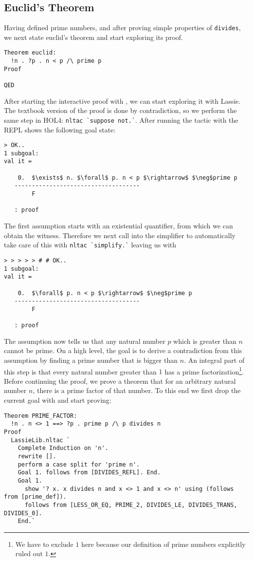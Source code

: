 \subsection{Euclid's Theorem}
Having defined prime numbers, and after proving simple properties of
\lstinline{divides}, we next state euclid's theorem and start
exploring its proof.

\begin{lstlisting}
Theorem euclid:
  !n . ?p . n < p /\ prime p
Proof

QED
\end{lstlisting}

After starting the interactive proof with , we can start exploring
it with Lassie.
The textbook version of the proof is done by contradiction, so we perform the
same step in HOL4: \lstinline{nltac `suppose not.`}.
After running the tactic with  the REPL shows the following goal state:
%
\begin{lstlisting}[frame=single, mathescape=true]
> OK..
1 subgoal:
val it =

    0.  $\exists$ n. $\forall$ p. n < p $\rightarrow$ $\neg$prime p
   ------------------------------------
        F

   : proof
\end{lstlisting}

The first assumption starts with an existential quantifier, from which we can
obtain the witness. Therefore we next call into the simplifier to automatically
take care of this with \lstinline{nltac `simplify.`} leaving us with
%
\begin{lstlisting}[frame=single, mathescape=true]
> > > > > # # OK..
1 subgoal:
val it =

    0.  $\forall$ p. n < p $\rightarrow$ $\neg$prime p
   ------------------------------------
        F

   : proof
\end{lstlisting}

The assumption now tells us that any natural number $p$ which is greater than
$n$ cannot be prime.
On a high level, the goal is to derive a contradiction from this assumption by
finding a prime number that is bigger than $n$.
An integral part of this step is that every natural number greater than $1$ has
a prime factorization\footnote{We have to exclude $1$ here because our definition of prime numbers explicitly ruled out $1$.}.
Before continuing the proof, we prove a theorem that for an arbitrary natural
number $n$, there is a prime factor of that number.
To this end we first drop the current goal with  and start proving:
%
\begin{lstlisting}
Theorem PRIME_FACTOR:
  !n . n <> 1 ==> ?p . prime p /\ p divides n
Proof
  LassieLib.nltac `
    Complete Induction on 'n'.
    rewrite [].
    perform a case split for 'prime n'.
    Goal 1. follows from [DIVIDES_REFL]. End.
    Goal 1.
      show '? x. x divides n and x <> 1 and x <> n' using (follows from [prime_def]).
      follows from [LESS_OR_EQ, PRIME_2, DIVIDES_LE, DIVIDES_TRANS, DIVIDES_0].
    End.`
\end{lstlisting}

